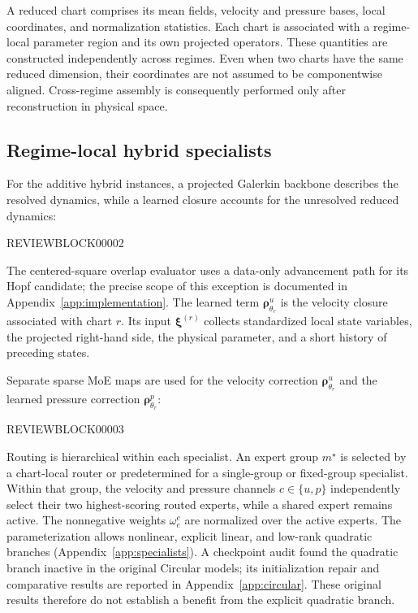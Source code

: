 \documentclass{article}
\begin{document}
A reduced chart comprises its mean fields, velocity and pressure bases, local coordinates, and normalization statistics. Each chart is associated with a regime-local parameter region and its own projected operators.
These quantities are constructed independently across regimes. Even when two charts have the same reduced dimension, their coordinates are not assumed to be componentwise aligned. Cross-regime assembly is consequently performed only after reconstruction in physical space.

\subsection{Regime-local hybrid specialists}

For the additive hybrid instances, a projected Galerkin backbone describes the resolved dynamics, while a learned closure accounts for the unresolved reduced dynamics:


REVIEWBLOCK00002


The centered-square overlap evaluator uses a data-only advancement path for its Hopf candidate; the precise scope of this exception is documented in Appendix~\ref{app:implementation}. The learned term $\bm\rho^u_{\theta_r}$ is the velocity closure associated with chart $r$. Its input $\bm\xi^{(r)}$ collects standardized local state variables, the projected right-hand side, the physical parameter, and a short history of preceding states.

Separate sparse MoE maps are used for the velocity correction $\bm\rho^u_{\theta_r}$ and the learned pressure correction $\bm\rho^p_{\theta_r}$:


REVIEWBLOCK00003


Routing is hierarchical within each specialist. An expert group $m^\star$ is selected by a chart-local router or predetermined for a single-group or fixed-group specialist. Within that group, the velocity and pressure channels $c\in\{u,p\}$ independently select their two highest-scoring routed experts, while a shared expert remains active. The nonnegative weights $\omega_e^c$ are normalized over the active experts. The parameterization allows nonlinear, explicit linear, and low-rank quadratic branches (Appendix~\ref{app:specialists}). A checkpoint audit found the quadratic branch inactive in the original Circular models; its initialization repair and comparative results are reported in Appendix~\ref{app:circular}. These original results therefore do not establish a benefit from the explicit quadratic branch.
\end{document}
